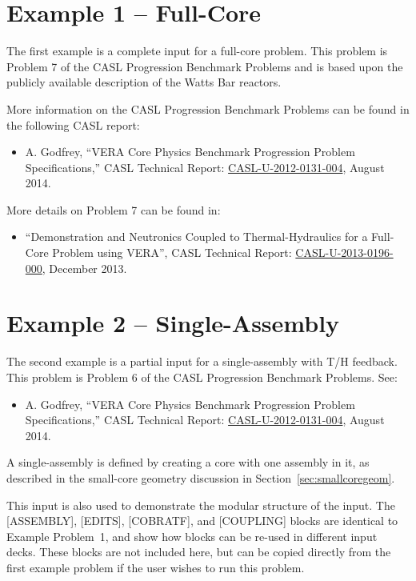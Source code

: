 \documentclass{report}
\numberwithin{equation}{section}
\begin{document}
\section{Example 1 -- Full-Core}
The first example is a complete input for a full-core problem.
This problem is Problem 7 of the CASL Progression Benchmark Problems and
is based upon the publicly available description of the Watts Bar reactors.

More information on the CASL Progression Benchmark Problems can be found in the following CASL report:
\begin{itemize}
\item A. Godfrey, ``VERA Core Physics Benchmark Progression Problem Specifications,''
CASL Technical Report: \href{http://www.casl.gov/docs/CASL-U-2012-0131-004.pdf}{CASL-U-2012-0131-004}, August 2014.
\end{itemize}

More details on Problem 7 can be found in:
\begin{itemize}
\item ``Demonstration and Neutronics Coupled to Thermal-Hydraulics for a Full-Core Problem using VERA'',
CASL Technical Report: \href{http://www.casl.gov/docs/CASL-U-2013-0196-000.pdf}{CASL-U-2013-0196-000}, December 2013.
\end{itemize}



\section{Example 2 -- Single-Assembly}
The second example is a partial input for a single-assembly with T/H feedback.
This problem is Problem 6 of the CASL Progression Benchmark Problems.  See:
\begin{itemize}
\item A. Godfrey, ``VERA Core Physics Benchmark Progression Problem Specifications,''                                      
CASL Technical Report: \href{http://www.casl.gov/docs/CASL-U-2012-0131-004.pdf}{CASL-U-2012-0131-004}, August 2014.
\end{itemize}

A single-assembly is defined by creating a core with one assembly in it, 
as described in the small-core geometry discussion in Section~\ref{sec:smallcoregeom}.

This input is also used to demonstrate the modular structure of the input.  The [ASSEMBLY],  [EDITS],
[COBRATF], and [COUPLING] blocks are identical to Example Problem~1, and show how blocks
can be re-used in different input decks.  
These blocks are not included here, but can be copied directly from the first
example problem if the user wishes to run this problem.
\end{document}
